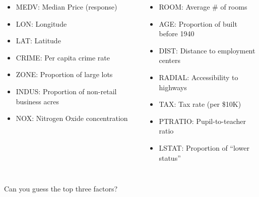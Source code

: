 \documentclass{beamer}\usepackage[]{graphicx}\usepackage[]{color}
\makeatletter
\newcommand{\hlstr}[1]{\textcolor[rgb]{1,0.894,0.71}{#1}}%
\newcommand{\hlopt}[1]{\textcolor[rgb]{1,0.894,0.769}{#1}}%
\newcommand{\hlstd}[1]{\textcolor[rgb]{1,0.894,0.769}{#1}}%
\newcommand{\hlkwc}[1]{\textcolor[rgb]{0.78,0.941,0.545}{#1}}%
\newcommand{\hlkwd}[1]{\textcolor[rgb]{1,0.78,0.769}{#1}}%
\newenvironment{kframe}{%
 \def\at@end@of@kframe{}%
 \ifinner\ifhmode%
  \def\at@end@of@kframe{\end{minipage}}%
  \begin{minipage}{\columnwidth}%
 \fi\fi%
 \def\FrameCommand##1{\hskip\@totalleftmargin \hskip-\fboxsep
 \colorbox{shadecolor}{##1}\hskip-\fboxsep
     \hskip-\linewidth \hskip-\@totalleftmargin \hskip\columnwidth}%
 \MakeFramed {\advance\hsize-\width
   \@totalleftmargin\z@ \linewidth\hsize
   \@setminipage}}%
 {\par\unskip\endMakeFramed%
 \at@end@of@kframe}
\newenvironment{knitrout}{}{} %
\makeatother
\begin{document}
\begin{darkframes}
\begin{frame}
      \begin{columns}[onlytextwidth]
          \begin{itemize}
            \item MEDV: Median Price (response)
            \item LON: Longitude
            \item LAT: Latitude
            \item CRIME: Per capita crime rate
            \item ZONE: Proportion of large lots
            \item INDUS: Proportion of non-retail business acres
            \item NOX: Nitrogen Oxide concentration
          \end{itemize}
          \begin{itemize}
            \item ROOM: Average \# of rooms
            \item AGE: Proportion of built before 1940
            \item DIST: Distance to employment centers
            \item RADIAL: Accessibility to highways
            \item TAX: Tax rate (per \$10K)
            \item PTRATIO: Pupil-to-teacher ratio
            \item LSTAT: Proportion of ``lower status''
          \end{itemize}
      \end{columns}
    
    \end{frame}
    
    
    
    
    
    \begin{frame}
        Can you guess the top three factors?
        \lc
    \end{frame}
    
    
    
    
\end{darkframes}
\end{document}
